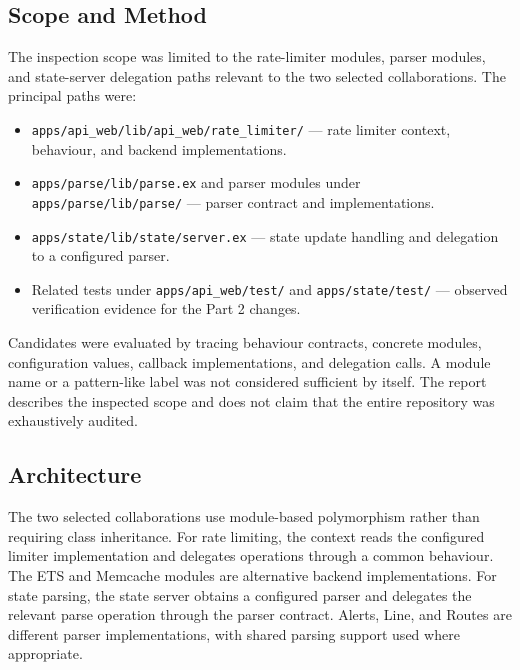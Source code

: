 \documentclass[11pt,a4paper]{article}
\newcommand{\code}[1]{\texttt{#1}}
\begin{document}
\subsection{Scope and Method}
The inspection scope was limited to the rate-limiter modules, parser modules, and state-server delegation paths relevant to the two selected collaborations. The principal paths were:
\begin{itemize}[leftmargin=*]
\item \code{apps/api\_web/lib/api\_web/rate\_limiter/} — rate limiter context, behaviour, and backend implementations.
\item \code{apps/parse/lib/parse.ex} and parser modules under \code{apps/parse/lib/parse/} — parser contract and implementations.
\item \code{apps/state/lib/state/server.ex} — state update handling and delegation to a configured parser.
\item Related tests under \code{apps/api\_web/test/} and \code{apps/state/test/} — observed verification evidence for the Part 2 changes.
\end{itemize}
Candidates were evaluated by tracing behaviour contracts, concrete modules, configuration values, callback implementations, and delegation calls. A module name or a pattern-like label was not considered sufficient by itself. The report describes the inspected scope and does not claim that the entire repository was exhaustively audited.

\subsection{Architecture}
The two selected collaborations use module-based polymorphism rather than requiring class inheritance. For rate limiting, the context reads the configured limiter implementation and delegates operations through a common behaviour. The ETS and Memcache modules are alternative backend implementations. For state parsing, the state server obtains a configured parser and delegates the relevant parse operation through the parser contract. Alerts, Line, and Routes are different parser implementations, with shared parsing support used where appropriate.
\end{document}
